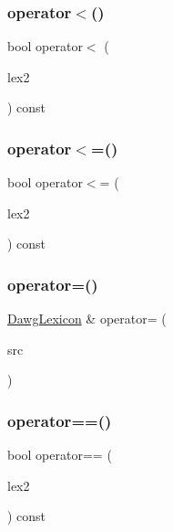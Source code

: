 \subsubsection{\texorpdfstring{operator$<$()}{operator<()}}
{\footnotesize\ttfamily bool operator$<$ (\begin{DoxyParamCaption}\item[{const \mbox{\hyperlink{classDawgLexicon}{Dawg\+Lexicon}} \&}]{lex2 }\end{DoxyParamCaption}) const}

\mbox{\label{classDawgLexicon_a054b62f48d59746ad45e92c1b278463e}} 
\subsubsection{\texorpdfstring{operator$<$=()}{operator<=()}}
{\footnotesize\ttfamily bool operator$<$= (\begin{DoxyParamCaption}\item[{const \mbox{\hyperlink{classDawgLexicon}{Dawg\+Lexicon}} \&}]{lex2 }\end{DoxyParamCaption}) const}

\mbox{\label{classDawgLexicon_a49b7a2bbf9b046065610b18f6ee07889}} 
\subsubsection{\texorpdfstring{operator=()}{operator=()}}
{\footnotesize\ttfamily \mbox{\hyperlink{classDawgLexicon}{Dawg\+Lexicon}} \& operator= (\begin{DoxyParamCaption}\item[{const \mbox{\hyperlink{classDawgLexicon}{Dawg\+Lexicon}} \&}]{src }\end{DoxyParamCaption})}

\mbox{\label{classDawgLexicon_a3703f712d34b03fe8ea4f7037ed1cb26}} 
\subsubsection{\texorpdfstring{operator==()}{operator==()}}
{\footnotesize\ttfamily bool operator== (\begin{DoxyParamCaption}\item[{const \mbox{\hyperlink{classDawgLexicon}{Dawg\+Lexicon}} \&}]{lex2 }\end{DoxyParamCaption}) const}

